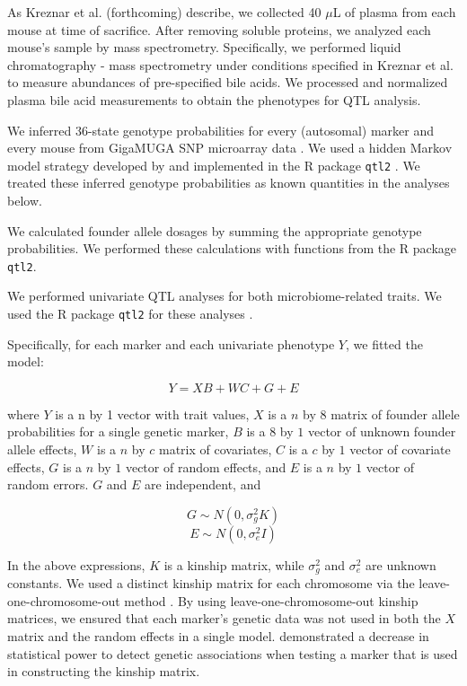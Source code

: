 \documentclass[oneside]{book}
\begin{document}
As Kreznar et al. (forthcoming) describe, we collected 40 $\mu$L of plasma from each mouse at time of sacrifice. After removing soluble proteins, we analyzed each mouse's sample by mass spectrometry. Specifically, we performed liquid chromatography - mass spectrometry under conditions specified in Kreznar et al. to measure abundances of pre-specified bile acids. We processed and normalized plasma bile acid measurements to obtain the phenotypes for QTL analysis.

We inferred 36-state genotype probabilities for every (autosomal) marker and every mouse from GigaMUGA SNP microarray data \citep{morgan2015mouse}. We used a hidden Markov model strategy developed by \citet{broman2012genotype, broman2012haplotype} and implemented in the R package \texttt{qtl2} \citep{qtl2}. We treated these inferred genotype probabilities as known quantities in the analyses below.

We calculated founder allele dosages by summing the appropriate genotype probabilities. We performed these calculations with functions from the R package \texttt{qtl2}\citep{qtl2}.

We performed univariate QTL analyses for both microbiome-related traits. We used the R package \texttt{qtl2} for these analyses \citep{qtl2}.

Specifically, for each marker and each univariate phenotype $Y$, we fitted the model:

\begin{equation}
Y = XB + WC + G + E  
\label{eq:uni-model}
\end{equation}

where $Y$ is a n by 1 vector with trait values, $X$ is a $n$ by $8$ matrix of founder allele probabilities for a single genetic marker, $B$ is a $8$ by $1$ vector of unknown founder allele effects, $W$ is a $n$ by $c$ matrix of covariates, $C$ is a $c$ by $1$ vector of covariate effects, $G$ is a $n$ by $1$ vector of random effects, and $E$ is a $n$ by $1$ vector of random errors. $G$ and $E$ are independent, and 

\begin{equation}
G \sim N(0, \sigma^2_g K)    
\end{equation}
\begin{equation}
E \sim N(0, \sigma^2_e I)    
\end{equation}


In the above expressions, $K$ is a kinship matrix, while $\sigma^2_g$ and $\sigma^2_e$ are unknown constants. We used a distinct kinship matrix for each chromosome via the leave-one-chromosome-out method \citep{yang2014advantages}. By using leave-one-chromosome-out kinship matrices, we ensured that each marker's genetic data was not used in both the $X$ matrix and the random effects in a single model. \citet{yang2014advantages} demonstrated a decrease in statistical power to detect genetic associations when testing a marker that is used in constructing the kinship matrix. 
\end{document}
